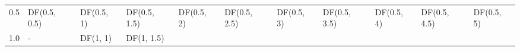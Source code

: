 \documentclass{article}
\begin{document}
\begin{longtable}[c]{@{}cllllllllll@{}}
\midrule
\endhead
\begin{minipage}[t]{0.08\columnwidth}\centering\strut
0.5
\strut\end{minipage} &
\begin{minipage}[t]{0.15\columnwidth}\raggedright\strut
DF(0.5, 0.5)
\strut\end{minipage} &
\begin{minipage}[t]{0.13\columnwidth}\raggedright\strut
DF(0.5, 1)
\strut\end{minipage} &
\begin{minipage}[t]{0.15\columnwidth}\raggedright\strut
DF(0.5, 1.5)
\strut\end{minipage} &
\begin{minipage}[t]{0.13\columnwidth}\raggedright\strut
DF(0.5, 2)
\strut\end{minipage} &
\begin{minipage}[t]{0.15\columnwidth}\raggedright\strut
DF(0.5, 2.5)
\strut\end{minipage} &
\begin{minipage}[t]{0.13\columnwidth}\raggedright\strut
DF(0.5, 3)
\strut\end{minipage} &
\begin{minipage}[t]{0.15\columnwidth}\raggedright\strut
DF(0.5, 3.5)
\strut\end{minipage} &
\begin{minipage}[t]{0.13\columnwidth}\raggedright\strut
DF(0.5, 4)
\strut\end{minipage} &
\begin{minipage}[t]{0.15\columnwidth}\raggedright\strut
DF(0.5, 4.5)
\strut\end{minipage} &
\begin{minipage}[t]{0.13\columnwidth}\raggedright\strut
DF(0.5, 5)
\strut\end{minipage}\tabularnewline
\begin{minipage}[t]{0.08\columnwidth}\centering\strut
1.0
\strut\end{minipage} &
\begin{minipage}[t]{0.15\columnwidth}\raggedright\strut
-
\strut\end{minipage} &
\begin{minipage}[t]{0.13\columnwidth}\raggedright\strut
DF(1, 1)
\strut\end{minipage} &
\begin{minipage}[t]{0.15\columnwidth}\raggedright\strut
DF(1, 1.5)
\strut\end{minipage} &
\begin{minipage}[t]{0.13\columnwidth}\raggedright\strut

\end{minipage}
\end{longtable}
\end{document}
